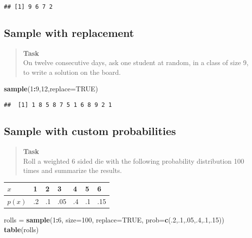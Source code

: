 \documentclass[
]{book}
\newenvironment{Shaded}{\begin{snugshade}}{\end{snugshade}}
\newcommand{\AttributeTok}[1]{\textcolor[rgb]{0.13,0.29,0.53}{#1}}
\newcommand{\ConstantTok}[1]{\textcolor[rgb]{0.56,0.35,0.01}{#1}}
\newcommand{\DecValTok}[1]{\textcolor[rgb]{0.00,0.00,0.81}{#1}}
\newcommand{\FunctionTok}[1]{\textcolor[rgb]{0.13,0.29,0.53}{\textbf{#1}}}
\newcommand{\NormalTok}[1]{#1}
\newcommand{\OtherTok}[1]{\textcolor[rgb]{0.56,0.35,0.01}{#1}}
\newcommand{\SpecialCharTok}[1]{\textcolor[rgb]{0.81,0.36,0.00}{\textbf{#1}}}
\theoremstyle{definition}
\theoremstyle{definition}
\theoremstyle{definition}
\theoremstyle{definition}
\theoremstyle{remark}
\begin{document}
\begin{verbatim}
## [1] 9 6 7 2
\end{verbatim}

\subsection*{Sample with replacement}\label{sample-with-replacement}

\begin{quote}
\textbf{Task}\\
On twelve consecutive days, ask one student at random, in a class of size 9, to write a solution on the board.
\end{quote}

\begin{Shaded}
\begin{Highlighting}[]
\FunctionTok{sample}\NormalTok{(}\DecValTok{1}\SpecialCharTok{:}\DecValTok{9}\NormalTok{,}\DecValTok{12}\NormalTok{,}\AttributeTok{replace=}\ConstantTok{TRUE}\NormalTok{)}
\end{Highlighting}
\end{Shaded}

\begin{verbatim}
##  [1] 1 8 5 8 7 5 1 6 8 9 2 1
\end{verbatim}

\subsection*{Sample with custom probabilities}\label{sample-with-custom-probabilities}

\begin{quote}
\textbf{Task}\\
Roll a weighted 6 sided die with the following probability distribution 100 times and summarize the results.
\end{quote}

\begin{longtable}[]{@{}lllllll@{}}
\toprule\noalign{}
\(x\) & 1 & 2 & 3 & 4 & 5 & 6 \\
\midrule\noalign{}
\endhead
\bottomrule\noalign{}
\endlastfoot
\(p(x)\) & .2 & .1 & .05 & .4 & .1 & .15 \\
\end{longtable}

\begin{Shaded}
\begin{Highlighting}[]
\NormalTok{rolls }\OtherTok{=} \FunctionTok{sample}\NormalTok{(}\DecValTok{1}\SpecialCharTok{:}\DecValTok{6}\NormalTok{,}
               \AttributeTok{size=}\DecValTok{100}\NormalTok{,}
               \AttributeTok{replace=}\ConstantTok{TRUE}\NormalTok{,}
               \AttributeTok{prob=}\FunctionTok{c}\NormalTok{(.}\DecValTok{2}\NormalTok{,.}\DecValTok{1}\NormalTok{,.}\DecValTok{05}\NormalTok{,.}\DecValTok{4}\NormalTok{,.}\DecValTok{1}\NormalTok{,.}\DecValTok{15}\NormalTok{))}
\FunctionTok{table}\NormalTok{(rolls)}
\end{Highlighting}
\end{Shaded}
\end{document}
